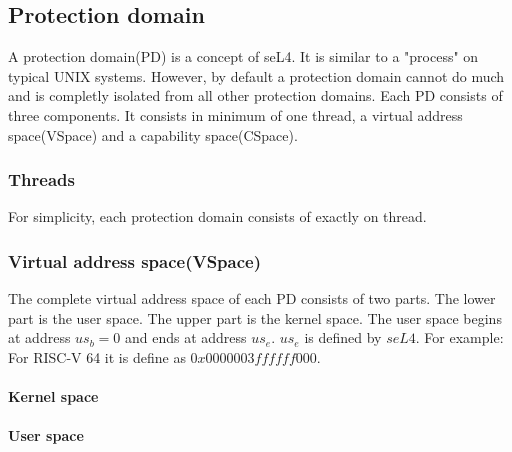 \subsection{Protection domain}
A protection domain(PD) is a concept of seL4. It is similar to a "process" on typical UNIX systems. 
However, by default a protection domain cannot do much and is completly isolated from all other protection domains.
Each PD consists of three components. It consists in minimum of one thread, a virtual address space(VSpace) and a capability space(CSpace).

\subsubsection{Threads}
For simplicity, each protection domain consists of exactly on thread.

\subsubsection{Virtual address space(VSpace)}
The complete virtual address space of each PD consists of two parts.
The lower part is the user space. The upper part is the kernel space.
The user space begins at address $us_b = 0$ and ends at address $us_e$. $us_e$ is defined
by $seL4$. For example: For RISC-V 64 it is define as $0x0000003ffffff000$.


\paragraph{Kernel space}


\paragraph{User space}

